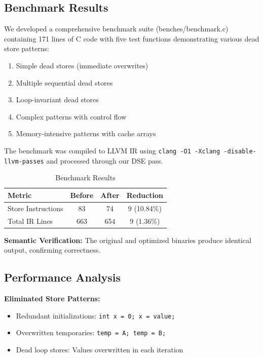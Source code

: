 \documentclass[journal]{IEEEtran}
\begin{document}
\subsection{Benchmark Results}

We developed a comprehensive benchmark suite (benches/benchmark.c) containing 171 lines of C code with five test functions demonstrating various dead store patterns:

\begin{enumerate}
\item Simple dead stores (immediate overwrites)
\item Multiple sequential dead stores
\item Loop-invariant dead stores
\item Complex patterns with control flow
\item Memory-intensive patterns with cache arrays
\end{enumerate}

The benchmark was compiled to LLVM IR using \texttt{clang -O1 -Xclang -disable-llvm-passes} and processed through our DSE pass.

\begin{table}[!t]
\renewcommand{\arraystretch}{1.3}
\caption{Benchmark Results}
\label{table_benchmark}
\centering
\begin{tabular}{|l|c|c|c|}
\hline
\textbf{Metric} & \textbf{Before} & \textbf{After} & \textbf{Reduction} \\
\hline
Store Instructions & 83 & 74 & 9 (10.84\%) \\
\hline
Total IR Lines & 663 & 654 & 9 (1.36\%) \\
\hline
\end{tabular}
\end{table}

\textbf{Semantic Verification:} The original and optimized binaries produce identical output, confirming correctness.

\subsection{Performance Analysis}

\textbf{Eliminated Store Patterns:}
\begin{itemize}
\item Redundant initializations: \texttt{int x = 0; x = value;}
\item Overwritten temporaries: \texttt{temp = A; temp = B;}
\item Dead loop stores: Values overwritten in each iteration
\end{itemize}
\end{document}
